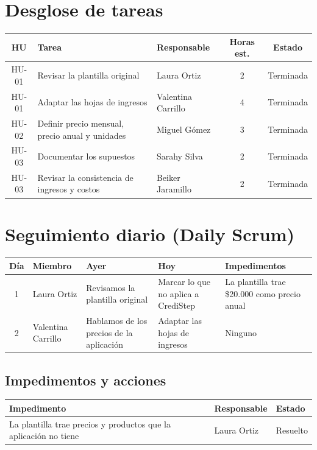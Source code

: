 \documentclass[11pt,a4paper]{article}
\begin{document}
\section{Desglose de tareas}

\begin{tabularx}{\textwidth}{c X l c c}
  \toprule
  \textbf{HU} & \textbf{Tarea} & \textbf{Responsable} & \textbf{Horas est.} & \textbf{Estado} \\
  \midrule
  HU-01 & Revisar la plantilla original & Laura Ortiz & 2 & Terminada \\
  HU-01 & Adaptar las hojas de ingresos & Valentina Carrillo & 4 & Terminada \\
  HU-02 & Definir precio mensual, precio anual y unidades & Miguel Gómez & 3 & Terminada \\
  HU-03 & Documentar los supuestos & Sarahy Silva & 2 & Terminada \\
  HU-03 & Revisar la consistencia de ingresos y costos & Beiker Jaramillo & 2 & Terminada \\
  \bottomrule
\end{tabularx}

\section{Seguimiento diario (Daily Scrum)}

\begin{tabularx}{\textwidth}{c l X X X}
  \toprule
  \textbf{Día} & \textbf{Miembro} & \textbf{Ayer} & \textbf{Hoy} & \textbf{Impedimentos} \\
  \midrule
  1 & Laura Ortiz & Revisamos la plantilla original & Marcar lo que no aplica a CrediStep & La plantilla trae \$20.000 como precio anual \\
  2 & Valentina Carrillo & Hablamos de los precios de la aplicación & Adaptar las hojas de ingresos & Ninguno \\
  \bottomrule
\end{tabularx}

\subsection{Impedimentos y acciones}

\begin{tabularx}{\textwidth}{X l l}
  \toprule
  \textbf{Impedimento} & \textbf{Responsable} & \textbf{Estado} \\
  \midrule
  La plantilla trae precios y productos que la aplicación no tiene & Laura Ortiz & Resuelto \\
  \bottomrule
\end{tabularx}
\end{document}
